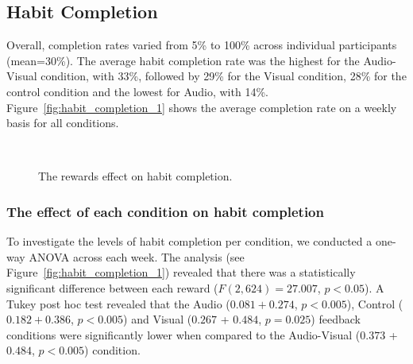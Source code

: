 \documentclass{scaffold/sigchi}
\begin{document}
\subsection{Habit Completion}
Overall, completion rates varied from 5\% to 100\% across individual participants (mean=30\%). The average habit completion rate was the highest for the Audio-Visual condition, with 33\%, followed by 29\% for the Visual condition, 28\% for the control condition and the lowest for Audio, with 14\%. Figure~\ref{fig:habit_completion_1} shows the average completion rate on a weekly basis for all conditions.


\begin{figure}
  \centering
  \caption{The rewards effect on habit completion.}~\label{fig:habit_completion_2}
\end{figure}

\subsubsection{The effect of each condition on habit completion}
To investigate the levels of habit completion per condition, we conducted a one-way ANOVA across each week. The analysis (see Figure~\ref{fig:habit_completion_1}) revealed that there was a statistically significant difference between each reward ($F(2,624) = 27.007$, $p < 0.05$). A Tukey post hoc test revealed that the Audio ($0.081 + 0.274$, $p < 0.005$), Control ($0.182 + 0.386$, $p < 0.005$) and Visual ($0.267$ + $0.484$, $p = 0.025$) feedback conditions were significantly lower when compared to the Audio-Visual ($0.373$ + $0.484$, $p < 0.005$) condition.
\end{document}

